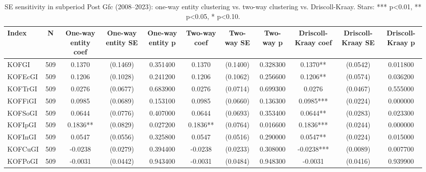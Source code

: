 \begin{table}[htbp]
\caption{SE sensitivity in subperiod Post Gfc (2008--2023): one-way entity clustering vs. two-way clustering vs. Driscoll-Kraay. Stars: *** p<0.01, ** p<0.05, * p<0.10.}
\label{tab:se_comparison_post_gfc}
\begin{tabular}{lcccccccccc}
\toprule
Index & N & One-way entity coef & One-way entity SE & One-way entity p & Two-way coef & Two-way SE & Two-way p & Driscoll-Kraay coef & Driscoll-Kraay SE & Driscoll-Kraay p \\
\midrule
KOFGI & 509 & 0.1370 & (0.1469) & 0.351400 & 0.1370 & (0.1400) & 0.328300 & 0.1370** & (0.0542) & 0.011800 \\
KOFEcGI & 509 & 0.1206 & (0.1028) & 0.241200 & 0.1206 & (0.1062) & 0.256600 & 0.1206** & (0.0574) & 0.036200 \\
KOFTrGI & 509 & 0.0276 & (0.0677) & 0.683900 & 0.0276 & (0.0714) & 0.699300 & 0.0276 & (0.0467) & 0.555000 \\
KOFFiGI & 509 & 0.0985 & (0.0689) & 0.153100 & 0.0985 & (0.0660) & 0.136300 & 0.0985*** & (0.0224) & 0.000000 \\
KOFSoGI & 509 & 0.0644 & (0.0776) & 0.407000 & 0.0644 & (0.0693) & 0.353400 & 0.0644** & (0.0283) & 0.023300 \\
KOFIpGI & 509 & 0.1836** & (0.0829) & 0.027200 & 0.1836** & (0.0764) & 0.016600 & 0.1836*** & (0.0244) & 0.000000 \\
KOFInGI & 509 & 0.0547 & (0.0556) & 0.325800 & 0.0547 & (0.0516) & 0.290000 & 0.0547** & (0.0224) & 0.015000 \\
KOFCuGI & 509 & -0.0238 & (0.0279) & 0.394400 & -0.0238 & (0.0233) & 0.308000 & -0.0238*** & (0.0089) & 0.007700 \\
KOFPoGI & 509 & -0.0031 & (0.0442) & 0.943400 & -0.0031 & (0.0484) & 0.948300 & -0.0031 & (0.0416) & 0.939900 \\
\bottomrule
\end{tabular}
\end{table}

